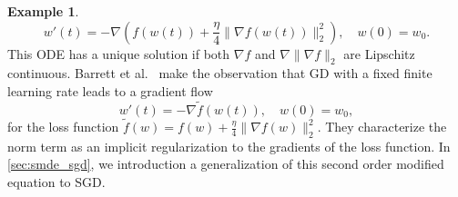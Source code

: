 \documentclass[12pt]{article}
\theoremstyle{definition}
\newtheorem{example}[example]{Example}
\numberwithin{equation}{section}
\newcommand{\norm}[1]{\lVert{#1}\rVert_2}
\begin{document}
\begin{example}
\begin{equation}
  \label{eq:second_order_ode}
  w'(t) = -\nabla\left(f(w(t)) + \frac{\eta}{4}\norm{\nabla f(w(t))}^2\right),\quad w(0) = w_0.
\end{equation}
This ODE has a unique solution if both $\nabla f$ and $\nabla\norm{\nabla f}$ are Lipschitz continuous.
Barrett et al.\ \cite{barrettImplicitGradientRegularization2021} make the observation that GD with a fixed finite learning rate leads to a gradient flow 
\begin{equation*}
  w'(t) = -\nabla\widetilde{f}(w(t)),\quad w(0) = w_0,
\end{equation*}
for the loss function $\widetilde{f}(w) = f(w) + \frac{\eta}{4}\norm{\nabla f(w)}^2$. They characterize the norm term as an implicit regularization to the gradients of the loss function.
In \autoref{sec:smde_sgd}, we introduction a generalization of this second order modified equation to SGD.
\end{example}
\end{document}
